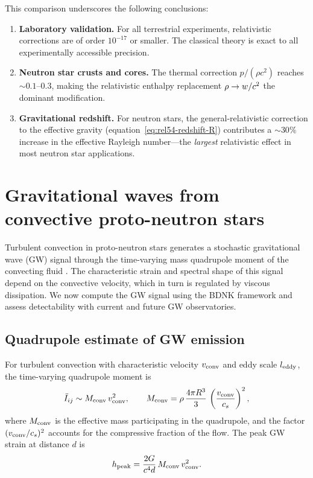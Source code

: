 This comparison underscores the following conclusions:
\begin{enumerate}
  \item \textbf{Laboratory validation.}  For all terrestrial
    experiments, relativistic corrections are of order $10^{-17}$ or
    smaller.  The classical theory is exact to all experimentally
    accessible precision.
  \item \textbf{Neutron star crusts and cores.}  The thermal
    correction $p/(\rho c^{2})$ reaches $\sim 0.1$--$0.3$, making
    the relativistic enthalpy replacement $\rho \to w/c^{2}$
    the dominant modification.
  \item \textbf{Gravitational redshift.}  For neutron stars, the
    general-relativistic correction to the effective gravity
    (equation~\eqref{eq:rel54-redshift-R}) contributes a $\sim 30\%$
    increase in the effective Rayleigh number---the \emph{largest}
    relativistic effect in most neutron star applications.
\end{enumerate}


\section{Gravitational waves from convective proto-neutron stars}
\label{sec:deep11-gw-convection}

Turbulent convection in proto-neutron stars generates a stochastic
gravitational wave (GW) signal through the time-varying mass quadrupole
moment of the convecting fluid \cite{OttEtAl2008,Burrows2013}.  The
characteristic strain and spectral shape of this signal depend on the
convective velocity, which in turn is regulated by viscous dissipation.
We now compute the GW signal using the BDNK framework and assess
detectability with current and future GW observatories.

\subsection{Quadrupole estimate of GW emission}

For turbulent convection with characteristic velocity $v_{\rm conv}$
and eddy scale $l_{\rm eddy}$, the time-varying quadrupole moment is
\begin{equation}\label{eq:deep11-Iddot}
  \ddot{I}_{ij} \sim M_{\rm conv}\, v_{\rm conv}^{2},
  \qquad
  M_{\rm conv} = \rho\,\frac{4\pi R^{3}}{3}\,
  \left(\frac{v_{\rm conv}}{c_s}\right)^{2},
\end{equation}
where $M_{\rm conv}$ is the effective mass participating in the
quadrupole, and the factor $(v_{\rm conv}/c_s)^{2}$ accounts for the
compressive fraction of the flow.  The peak GW strain at distance $d$ is
\begin{equation}\label{eq:deep11-h-peak}
  h_{\rm peak} = \frac{2G}{c^{4} d}\, M_{\rm conv}\, v_{\rm conv}^{2}.
\end{equation}

